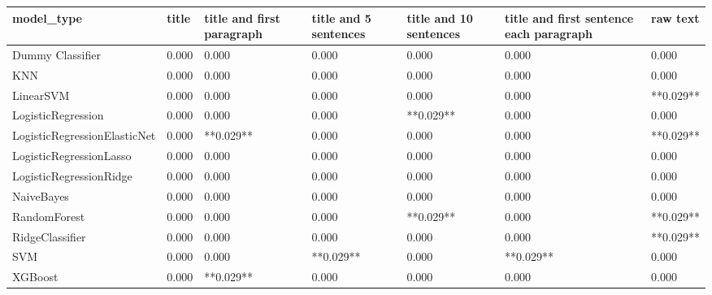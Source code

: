 \begin{tabular}{lllllll}
\toprule
                  model\_type & title & title and first paragraph & title and 5 sentences & title and 10 sentences & title and first sentence each paragraph &  raw text \\
\midrule
            Dummy Classifier & 0.000 &                     0.000 &                 0.000 &                  0.000 &                                   0.000 &     0.000 \\
                         KNN & 0.000 &                     0.000 &                 0.000 &                  0.000 &                                   0.000 &     0.000 \\
                   LinearSVM & 0.000 &                     0.000 &                 0.000 &                  0.000 &                                   0.000 & **0.029** \\
          LogisticRegression & 0.000 &                     0.000 &                 0.000 &              **0.029** &                                   0.000 &     0.000 \\
LogisticRegressionElasticNet & 0.000 &                 **0.029** &                 0.000 &                  0.000 &                                   0.000 & **0.029** \\
     LogisticRegressionLasso & 0.000 &                     0.000 &                 0.000 &                  0.000 &                                   0.000 &     0.000 \\
     LogisticRegressionRidge & 0.000 &                     0.000 &                 0.000 &                  0.000 &                                   0.000 &     0.000 \\
                  NaiveBayes & 0.000 &                     0.000 &                 0.000 &                  0.000 &                                   0.000 &     0.000 \\
                RandomForest & 0.000 &                     0.000 &                 0.000 &              **0.029** &                                   0.000 & **0.029** \\
             RidgeClassifier & 0.000 &                     0.000 &                 0.000 &                  0.000 &                                   0.000 & **0.029** \\
                         SVM & 0.000 &                     0.000 &             **0.029** &                  0.000 &                               **0.029** &     0.000 \\
                     XGBoost & 0.000 &                 **0.029** &                 0.000 &                  0.000 &                                   0.000 &     0.000 \\
\bottomrule
\end{tabular}
